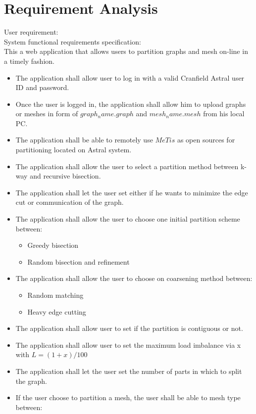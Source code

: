\documentclass{cranfieldChart}
\begin{document}
\section{Requirement Analysis} 
User requirement: \\
System functional requirements specification: \\
This a web application that allows users to partition graphs and mesh on-line in a timely fashion. 
\begin{itemize}
    \item The application shall allow user to log in with a valid Cranfield Astral user ID and password. 
    \item Once the user is logged in, the application shall allow him to upload graphs or meshes in form of $graph_name.graph$ and $mesh_name.mesh$ from his local PC. 
    \item The application shall be able to remotely use $MeTis$ as open sources for partitioning located on Astral system. 
    \item The application shall allow the user to select a partition method between k-way and recursive bisection.
     \item The application shall let the user set either if he wants to minimize the edge cut or communication of the graph.
    \item The application shall allow the user to choose one initial partition scheme between:
        \begin{itemize}
             \item Greedy bisection
            \item Random bisection and refinement 
        \end{itemize}
    \item The application shall allow the user to choose on coarsening method between: 
        \begin{itemize}
            \item Random matching 
            \item Heavy edge cutting 
        \end{itemize}
    \item The application shall allow user to set if the partition is contiguous or not. 
    \item The application shall allow user to set the maximum load imbalance via x with $L= (1+x)/100$
    \item The application shall let the user set the number of parts in which to split the graph. 
    \item If the user choose to partition a mesh, the user shall be able to mesh type between: 

\end{itemize}
\end{document}
